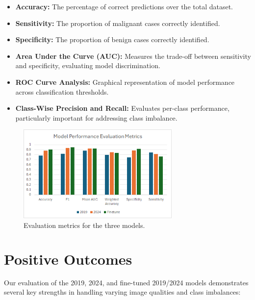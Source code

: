 \documentclass{article}
\begin{document}
\begin{itemize}
    \item \textbf{Accuracy:} The percentage of correct predictions over the total dataset.
    \item \textbf{Sensitivity:} The proportion of malignant cases correctly identified.
    \item \textbf{Specificity:} The proportion of benign cases correctly identified.
    \item \textbf{Area Under the Curve (AUC):} Measures the trade-off between sensitivity and specificity, evaluating
model discrimination.
    \item \textbf{ROC Curve Analysis:} Graphical representation of model performance across classification thresholds.
    \item \textbf{Class-Wise Precision and Recall:} Evaluates per-class performance, particularly important for
addressing class imbalance.
\end{itemize}

\begin{figure}[h]
    \label{eval_plot}
    \caption{Evaluation metrics for the three models.}
    \includegraphics[width=8cm]{model-performance.png}
\end{figure}

\section{Positive Outcomes}

Our evaluation of the 2019, 2024, and fine-tuned 2019/2024 models demonstrates several key strengths in handling
varying image qualities and class imbalances:
\end{document}
